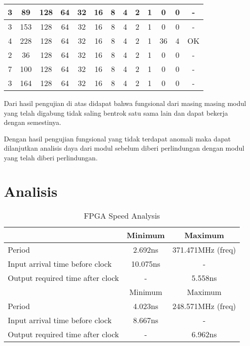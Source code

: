 \begin{table}[H]
\begin{tabular}{|c|c|c|c|c|c|c|c|c|c|c|c|c|}
		\hline
		3     & 89    & 128   & 64    & 32    & 16    & 8     & 4     & 2     & 1     & 0     & 0     & - \bigstrut\\
		\hline
		3     & 153   & 128   & 64    & 32    & 16    & 8     & 4     & 2     & 1     & 0     & 0     & - \bigstrut\\
		\hline
		4     & 228   & 128   & 64    & 32    & 16    & 8     & 4     & 2     & 1     & 36    & 4     & OK \bigstrut\\
		\hline
		2     & 36    & 128   & 64    & 32    & 16    & 8     & 4     & 2     & 1     & 0     & 0     & - \bigstrut\\
		\hline
		7     & 100   & 128   & 64    & 32    & 16    & 8     & 4     & 2     & 1     & 0     & 0     & - \bigstrut\\
		\hline
		3     & 164   & 128   & 64    & 32    & 16    & 8     & 4     & 2     & 1     & 0     & 0     & - \bigstrut\\
		\hline
	\end{tabular}%
\end{table}%

Dari hasil pengujian di atas didapat bahwa fungsional dari masing masing modul yang telah digabung tidak saling bentrok satu sama lain dan dapat bekerja dengan semestinya.

Dengan hasil pengujian fungsional yang tidak terdapat anomali maka dapat dilanjutkan analisis daya dari modul sebelum diberi perlindungan dengan modul yang telah diberi perlindungan.

\section{Analisis}

\begin{table}[H]
	\centering
	\caption{FPGA Speed Analysis}
	\label{tab:speed}%
	\begin{tabular}{|l|c|c|}
		\hline
		\rowcolor[rgb]{ .906,  .902,  .902} \multicolumn{1}{|c|}{Unprotected} & Minimum & Maximum \bigstrut\\
		\hline
		Period & 2.692ns & 371.471MHz (freq) \bigstrut\\
		\hline
		Input arrival time before clock & 10.075ns & - \bigstrut\\
		\hline
		Output required time after clock & -     & 5.558ns \bigstrut\\
		\hline
		\rowcolor[rgb]{ .906,  .902,  .902} \multicolumn{1}{|c|}{Protected} & Minimum & Maximum \bigstrut\\
		\hline
		Period & 4.023ns & 248.571MHz (freq) \bigstrut\\
		\hline
		Input arrival time before clock & 8.667ns & - \bigstrut\\
		\hline
		Output required time after clock & -     & 6.962ns \bigstrut\\
		\hline
	\end{tabular}%
\end{table}%

